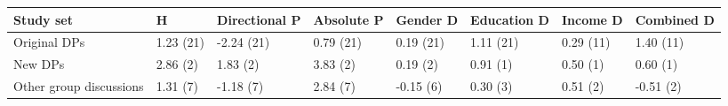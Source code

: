 
\begin{tabular}{llllllll}
\toprule
Study set & H & Directional P & Absolute P & Gender D & Education D & Income D & Combined D\\
\midrule
Original DPs & 1.23 (21) & -2.24 (21) & 0.79 (21) & 0.19 (21) & 1.11 (21) & 0.29 (11) & 1.40 (11)\\
New DPs & 2.86 (2) & 1.83 (2) & 3.83 (2) & 0.19 (2) & 0.91 (1) & 0.50 (1) & 0.60 (1)\\
Other group discussions & 1.31 (7) & -1.18 (7) & 2.84 (7) & -0.15 (6) & 0.30 (3) & 0.51 (2) & -0.51 (2)\\
\bottomrule
\end{tabular}
